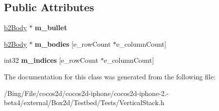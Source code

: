 \subsection*{Public Attributes}
\begin{DoxyCompactItemize}
\item 
\hypertarget{class_vertical_stack_a49324887a2265208c0750c440c8d0d2f}{\hyperlink{classb2_body}{b2\-Body} $\ast$ {\bfseries m\-\_\-bullet}}\label{class_vertical_stack_a49324887a2265208c0750c440c8d0d2f}

\item 
\hypertarget{class_vertical_stack_a9e51d3dfd3634aefd309d3a35e8cae69}{\hyperlink{classb2_body}{b2\-Body} $\ast$ {\bfseries m\-\_\-bodies} \mbox{[}e\-\_\-row\-Count $\ast$e\-\_\-column\-Count\mbox{]}}\label{class_vertical_stack_a9e51d3dfd3634aefd309d3a35e8cae69}

\item 
\hypertarget{class_vertical_stack_a031e5894cfd4a3dfd8db602d76ab3d25}{int32 {\bfseries m\-\_\-indices} \mbox{[}e\-\_\-row\-Count $\ast$e\-\_\-column\-Count\mbox{]}}\label{class_vertical_stack_a031e5894cfd4a3dfd8db602d76ab3d25}

\end{DoxyCompactItemize}


The documentation for this class was generated from the following file\-:\begin{DoxyCompactItemize}
\item 
/\-Bing/\-File/cocos2d/cocos2d-\/iphone/cocos2d-\/iphone-\/2.-\/beta4/external/\-Box2d/\-Testbed/\-Tests/Vertical\-Stack.\-h\end{DoxyCompactItemize}
